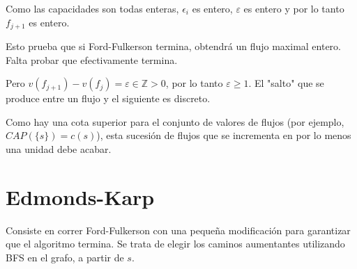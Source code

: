 \documentclass[10pt,a4paper]{article}
\begin{document}
Como las capacidades son todas enteras, $\epsilon_i$ es entero, $\varepsilon $ es entero y por lo tanto $f_{j+1}$ es entero.

Esto prueba que si Ford-Fulkerson termina, obtendrá un flujo maximal entero. Falta probar que efectivamente termina.

Pero $v(f_{j+1}) - v(f_j) = \varepsilon \in \mathbb{Z} > 0$, por lo tanto $\varepsilon \geq 1$. El "salto" que se produce entre un flujo y el siguiente es discreto.

Como hay una cota superior para el conjunto de valores de flujos (por ejemplo, $CAP(\{s\}) = c(s)$), esta sucesión de flujos que se incrementa en por lo menos una unidad debe acabar.

\section*{Edmonds-Karp}

Consiste en correr Ford-Fulkerson con una pequeña modificación para garantizar que el algoritmo termina. Se trata de elegir los caminos aumentantes utilizando BFS en el grafo, a partir de $s$.
\end{document}
